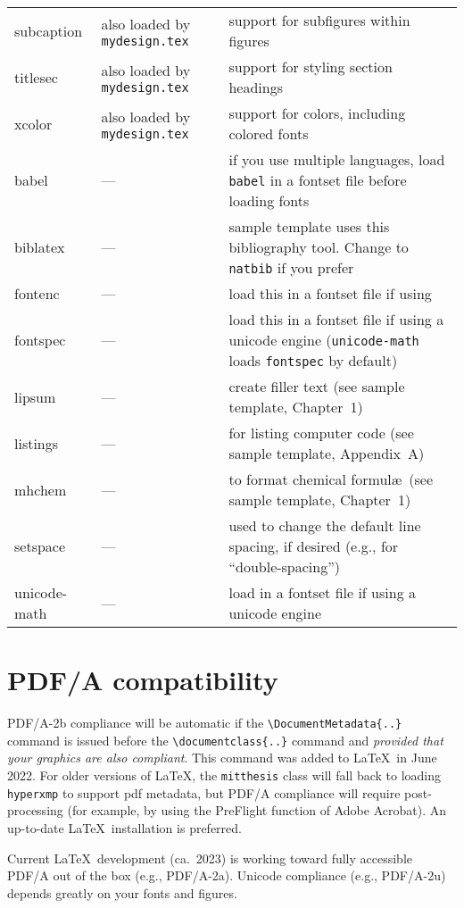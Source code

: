 \documentclass[11pt]{article}
\newcommand*\pdfTeX{\hologo{pdfTeX}}
\begin{document}
\begin{table}[t]
{\begin{tabular*}{\textwidth}{>{\ttfamily}l<{}@{\extracolsep{\fill}}p{18em} p{22em} }
subcaption & also loaded by \texttt{mydesign.tex}		& support for subfigures within figures \\
titlesec   & also loaded by \texttt{mydesign.tex} 		& support for styling section headings \\
xcolor	   & also loaded by \texttt{mydesign.tex} 		& support for colors, including colored fonts \\[0.7em]
\midrule
babel	 & --- & if you use multiple languages, load \texttt{babel} in a fontset file before loading fonts \\
biblatex & --- & sample template uses this bibliography tool. Change to \texttt{natbib} if you prefer\\
fontenc	 & --- & load this in a fontset file if using \pdfTeX\\
fontspec & --- & load this in a fontset file if using a unicode engine (\texttt{unicode-math} loads \texttt{fontspec} by default)\\
lipsum   & --- & create filler text (see sample template, Chapter~1) \\
listings & --- & for listing computer code (see sample template, Appendix~A) \\
mhchem   & --- & to format chemical formul\ae\ (see sample template, Chapter~1) \\
setspace & --- & used to change the default line spacing, if desired (e.g., for ``double-spacing'')\\
unicode-math & --- & load in a fontset file if using a unicode engine\\
\bottomrule
\end{tabular*}}%
\end{table}

\section*{PDF/A compatibility}
PDF/A-2b compliance will be automatic if the \verb|\DocumentMetadata{..}| command is issued before the \verb|\documentclass{..}| command and \textit{provided that your graphics are also compliant}. This command was added to \LaTeX\ in June 2022. For older versions of \LaTeX, the \texttt{mitthesis} class will fall back to loading \texttt{hyperxmp} to support pdf metadata, but PDF/A compliance will require post-processing (for example, by using the PreFlight function of Adobe Acrobat). An up-to-date \LaTeX\ installation is preferred.

Current \LaTeX\ development (ca.~2023) is working toward fully accessible PDF/A out of the box (e.g., PDF/A-2a). Unicode compliance (e.g., PDF/A-2u) depends greatly on your fonts and figures.
\end{document}
